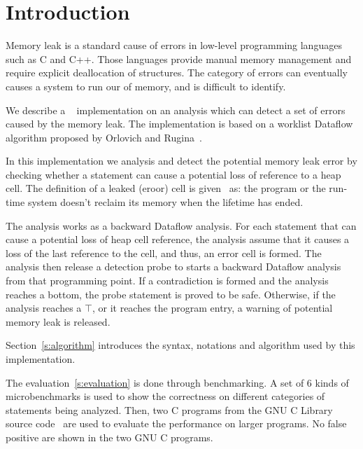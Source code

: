 \section{Introduction}
Memory leak is a standard cause of errors in low-level programming languages
such as C and C++. Those languages provide manual memory management and require
explicit deallocation of structures. The category of errors can eventually
causes a system to run our of memory, and is difficult to identify.

We describe a \llvm~\cite{llvm} implementation on an analysis which
can detect a set of errors caused by the memory leak. The implementation is
based on a worklist Dataflow algorithm proposed by Orlovich and 
Rugina~\cite{rugina}.

In this implementation we analysis and detect the potential memory leak error
by checking whether a statement can cause a potential loss of reference to a 
heap cell. The definition of a leaked (eroor) cell is given~\cite{rugina} as: the 
program or the run-time system doesn't reclaim its memory when the lifetime 
has ended.

The analysis works as a backward Dataflow analysis. For each statement that 
can cause a potential loss of heap cell reference, the analysis assume that 
it causes a loss of the last reference to the cell, and thus, an error cell
is formed. The analysis then release a detection probe to starts a backward 
Dataflow analysis from that programming point. If a contradiction is formed 
and the analysis reaches a bottom, the probe statement is proved to be safe. 
Otherwise, if the analysis reaches a $\top$, or it reaches the program entry, 
a warning of potential memory leak is released.

Section~\ref{s:algorithm} introduces the syntax, notations and algorithm
used by this implementation.

The evaluation~\ref{s:evaluation} is done through benchmarking. A set of 6 kinds
of microbenchmarks is used to show the correctness on different categories of
statements being analyzed. Then, two C programs from the GNU C Library source
code~\cite{glibc} are used to evaluate the performance on larger programs. No 
false positive are shown in the two GNU C programs.
